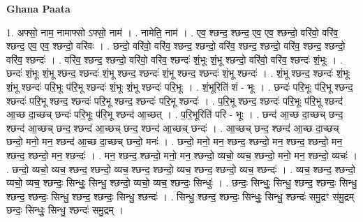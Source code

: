 \documentclass[17pt]{extarticle}
\begin{document}
\textbf{Ghana Paata } \newline

1. अफ्सो॒ नाम॒ नामाफ्सो ऽफ्सो॒ नाम॑ । . नामेति॒ नाम॑ । . एव॒ श्छन्द॒ श्छन्द॒ एव॒ एव॒ श्छन्दो॒ वरि॑वो॒ वरि॑व॒ श्छन्द॒ एव॒ एव॒ श्छन्दो॒ वरि॑वः । . छन्दो॒ वरि॑वो॒ वरि॑व॒ श्छन्द॒ श्छन्दो॒ वरि॑व॒ श्छन्द॒ श्छन्दो॒ वरि॑व॒ श्छन्द॒ श्छन्दो॒ वरि॑व॒ श्छन्दः॑ । . वरि॑व॒ श्छन्द॒ श्छन्दो॒ वरि॑वो॒ वरि॑व॒ श्छन्दः॑ शं॒भूः शं॒भू श्छन्दो॒ वरि॑वो॒ वरि॑व॒ श्छन्दः॑ शं॒भूः । . छन्दः॑ शं॒भूः शं॒भू श्छन्द॒ श्छन्दः॑ शं॒भू श्छन्द॒ श्छन्दः॑ शं॒भू श्छन्द॒ श्छन्दः॑ शं॒भू श्छन्दः॑ । . शं॒भू श्छन्द॒ श्छन्दः॑ शं॒भूः शं॒भू श्छन्दः॑ परि॒भूः प॑रि॒भू श्छन्दः॑ शं॒भूः शं॒भू श्छन्दः॑ परि॒भूः । . शं॒भूरिति॑ शं - भूः । . छन्दः॑ परि॒भूः प॑रि॒भू श्छन्द॒ श्छन्दः॑ परि॒भू श्छन्द॒ श्छन्दः॑ परि॒भू श्छन्द॒ श्छन्दः॑ परि॒भू श्छन्दः॑ । . प॒रि॒भू श्छन्द॒ श्छन्दः॑ परि॒भूः प॑रि॒भू श्छन्द॑ आ॒च्छ दा॒च्छच् छन्दः॑ परि॒भूः प॑रि॒भू श्छन्द॑ आ॒च्छत् । . प॒रि॒भूरिति॑ परि - भूः । . छन्द॑ आ॒च्छ दा॒च्छच् छन्द॒ श्छन्द॑ आ॒च्छच् छन्द॒ श्छन्द॑ आ॒च्छच् छन्द॒ श्छन्द॑ आ॒च्छच् छन्दः॑ । . आ॒च्छच् छन्द॒ श्छन्द॑ आ॒च्छ दा॒च्छच् छन्दो॒ मनो॒ मन॒ श्छन्द॑ आ॒च्छ दा॒च्छच् छन्दो॒ मनः॑ । . छन्दो॒ मनो॒ मन॒ श्छन्द॒ श्छन्दो॒ मन॒ श्छन्द॒ श्छन्दो॒ मन॒ श्छन्द॒ श्छन्दो॒ मन॒ श्छन्दः॑ । . मन॒ श्छन्द॒ श्छन्दो॒ मनो॒ मन॒ श्छन्दो॒ व्यचो॒ व्यच॒ श्छन्दो॒ मनो॒ मन॒ श्छन्दो॒ व्यचः॑ । . छन्दो॒ व्यचो॒ व्यच॒ श्छन्द॒ श्छन्दो॒ व्यच॒ श्छन्द॒ श्छन्दो॒ व्यच॒ श्छन्द॒ श्छन्दो॒ व्यच॒ श्छन्दः॑ । . व्यच॒ श्छन्द॒ श्छन्दो॒ व्यचो॒ व्यच॒ श्छन्दः॒ सिन्धुः॒ सिन्धु॒ श्छन्दो॒ व्यचो॒ व्यच॒ श्छन्दः॒ सिन्धुः॑ । . छन्दः॒ सिन्धुः॒ सिन्धु॒ श्छन्द॒ श्छन्दः॒ सिन्धु॒ श्छन्द॒ श्छन्दः॒ सिन्धु॒ श्छन्द॒ श्छन्दः॒ सिन्धु॒ श्छन्दः॑ । . सिन्धु॒ श्छन्द॒ श्छन्दः॒ सिन्धुः॒ सिन्धु॒ श्छन्दः॑ समु॒द्रꣳ स॑मु॒द्रम् छन्दः॒ सिन्धुः॒ सिन्धु॒ श्छन्दः॑ समु॒द्रम् । \newline
\end{document}
